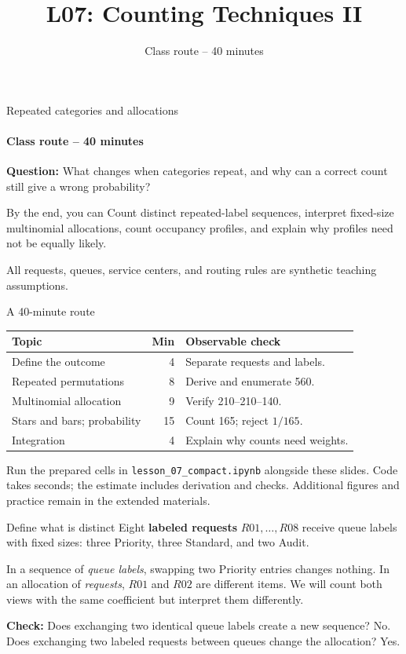 \documentclass[aspectratio=169,10pt,english]{beamer}
\title{L07: Counting Techniques II}
\subtitle{Class route -- 40 minutes}
\author{}
\date{}
\begin{document}
\begin{frame}{Repeated categories and allocations}
\framesubtitle{Class route -- 40 minutes}
\textbf{Question:} What changes when categories repeat, and why can a correct count still give a wrong probability?
\begin{block}{By the end, you can}
Count distinct repeated-label sequences, interpret fixed-size multinomial allocations, count occupancy profiles, and explain why profiles need not be equally likely.
\end{block}
\smallskip
All requests, queues, service centers, and routing rules are synthetic teaching assumptions.
\end{frame}

\begin{frame}{A 40-minute route}
\small
\begin{tabular}{p{.43\linewidth}rp{.38\linewidth}}
\toprule Topic & Min & Observable check \\ \midrule
Define the outcome & 4 & Separate requests and labels.\\
Repeated permutations & 8 & Derive and enumerate 560.\\
Multinomial allocation & 9 & Verify 210--210--140.\\
Stars and bars; probability & 15 & Count 165; reject $1/165$.\\
Integration & 4 & Explain why counts need weights.\\ \bottomrule
\end{tabular}
\par\medskip
Run the prepared cells in \texttt{lesson\_07\_compact.ipynb} alongside these slides. Code takes seconds; the estimate includes derivation and checks. Additional figures and practice remain in the extended materials.
\end{frame}

\begin{frame}{Define what is distinct}
\small
Eight \textbf{labeled requests} $R01,\ldots,R08$ receive queue labels with fixed sizes: three Priority, three Standard, and two Audit.
\par\medskip
In a sequence of \emph{queue labels}, swapping two Priority entries changes nothing. In an allocation of \emph{requests}, $R01$ and $R02$ are different items. We will count both views with the same coefficient but interpret them differently.
\par\medskip
\textbf{Check:} Does exchanging two identical queue labels create a new sequence? No. Does exchanging two labeled requests between queues change the allocation? Yes.
\end{frame}
\end{document}
